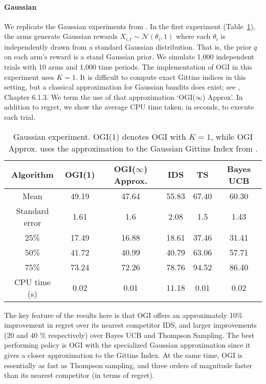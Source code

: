\paragraph{Gaussian}We replicate the Gaussian experiments from \cite{russo2014learning}. In the first experiment (Table~\ref{table:gaussian_experiment1}), the arms generate Gaussian rewards  $X_{i,t} \sim \mathcal{N}(\theta_i, 1)$ where each $\theta_i$ is independently drawn from a standard Gaussian distribution. {\color{blue}That is, the prior $q$ on each arm's reward is a stand Gaussian prior.} We simulate 1,000 independent trials with 10 arms and 1,000 time periods. The implementation of OGI in this experiment uses $K = 1$. It is difficult to compute exact Gittins indices in this setting, but a classical approximation for Gaussian bandits does exist; see \cite{powell2012optimal}, Chapter 6.1.3. We term the use of that approximation `OGI($\infty$) Approx'.  In addition to regret, we  show the average CPU time taken, in seconds, to execute each trial.

\begin{table}[h!]
	\centering
	\begin{tabular}{cccccc} \toprule
		\textbf{Algorithm}  & \textbf{OGI(1)} & \textbf{OGI($\infty$) Approx.} & \textbf{IDS} & \textbf{TS} & \textbf{Bayes UCB}\\ \midrule
		Mean   & 49.19 & 47.64  &  55.83 & 67.40 & 60.30  \\ 
		Standard error  & 1.61 & 1.6 & 2.08 & 1.5 & 1.43 \\ 
		25\%  & 17.49 & 16.88  & 18.61 & 37.46 & 31.41 \\
		50\%   & 41.72 & 40.99 & 40.79 & 63.06 & 57.71 \\ 
		75\%  & 73.24 & 72.26 & 78.76 & 94.52 & 86.40 \\ 
		CPU time (s) & 0.02 & 0.01 & 11.18 & 0.01 & 0.02 \\
		\bottomrule
	\end{tabular}
	\caption[Table caption text]{Gaussian experiment. OGI(1) denotes OGI with $K =1$, while OGI Approx. uses the approximation to the Gaussian Gittins Index from \cite{powell2012optimal}.}
	\label{table:gaussian_experiment1}
\end{table}

The key feature of the results here is that OGI offers an approximately 10\% improvement in regret over its nearest competitor IDS, and larger improvements (20 and 40 \% respectively) over Bayes UCB and Thompson Sampling. The best performing policy is OGI with the specialized Gaussian approximation since it gives a closer approximation to the Gittins Index. At the same time, OGI is essentially as fast as Thompson sampling, and three orders of magnitude faster than its nearest competitor (in terms of regret). 


